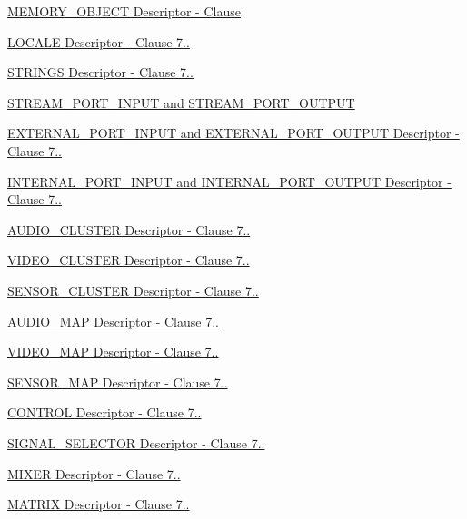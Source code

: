 \begin{DoxyCompactItemize}
\hyperlink{group__descriptor__memory__object}{M\+E\+M\+O\+R\+Y\+\_\+\+O\+B\+J\+E\+C\+T Descriptor -\/ Clause}
\item 
\hyperlink{group__descriptor__locale}{L\+O\+C\+A\+L\+E Descriptor -\/ Clause 7..}
\item 
\hyperlink{group__descriptor__strings}{S\+T\+R\+I\+N\+G\+S Descriptor -\/ Clause 7..}
\item 
\hyperlink{group__descriptor__stream__port}{S\+T\+R\+E\+A\+M\+\_\+\+P\+O\+R\+T\+\_\+\+I\+N\+P\+U\+T and S\+T\+R\+E\+A\+M\+\_\+\+P\+O\+R\+T\+\_\+\+O\+U\+T\+P\+UT}
\item 
\hyperlink{group__descriptor__external__port}{E\+X\+T\+E\+R\+N\+A\+L\+\_\+\+P\+O\+R\+T\+\_\+\+I\+N\+P\+U\+T and E\+X\+T\+E\+R\+N\+A\+L\+\_\+\+P\+O\+R\+T\+\_\+\+O\+U\+T\+P\+U\+T Descriptor -\/ Clause 7..}
\item 
\hyperlink{group__descriptor__internal__port}{I\+N\+T\+E\+R\+N\+A\+L\+\_\+\+P\+O\+R\+T\+\_\+\+I\+N\+P\+U\+T and I\+N\+T\+E\+R\+N\+A\+L\+\_\+\+P\+O\+R\+T\+\_\+\+O\+U\+T\+P\+U\+T Descriptor -\/ Clause 7..}
\item 
\hyperlink{group__descriptor__audio__cluster}{A\+U\+D\+I\+O\+\_\+\+C\+L\+U\+S\+T\+E\+R Descriptor -\/ Clause 7..}
\item 
\hyperlink{group__descriptor__video__cluster}{V\+I\+D\+E\+O\+\_\+\+C\+L\+U\+S\+T\+E\+R Descriptor -\/ Clause 7..}
\item 
\hyperlink{group__descriptor__sensor__cluster}{S\+E\+N\+S\+O\+R\+\_\+\+C\+L\+U\+S\+T\+E\+R Descriptor -\/ Clause 7..}
\item 
\hyperlink{group__descriptor__audio__map}{A\+U\+D\+I\+O\+\_\+\+M\+A\+P Descriptor -\/ Clause 7..}
\item 
\hyperlink{group__descriptor__video__map}{V\+I\+D\+E\+O\+\_\+\+M\+A\+P Descriptor -\/ Clause 7..}
\item 
\hyperlink{group__descriptor__sensor__map}{S\+E\+N\+S\+O\+R\+\_\+\+M\+A\+P Descriptor -\/ Clause 7..}
\item 
\hyperlink{group__descriptor__control}{C\+O\+N\+T\+R\+O\+L Descriptor -\/ Clause 7..}
\item 
\hyperlink{group__descriptor__signal__selector}{S\+I\+G\+N\+A\+L\+\_\+\+S\+E\+L\+E\+C\+T\+O\+R Descriptor -\/ Clause 7..}
\item 
\hyperlink{group__descriptor__mixer}{M\+I\+X\+E\+R Descriptor -\/ Clause 7..}
\item 
\hyperlink{group__descriptor__matrix}{M\+A\+T\+R\+I\+X Descriptor -\/ Clause 7..}

\end{DoxyCompactItemize}
